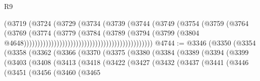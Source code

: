 \begin{lexlean}{R9}
\begin{coremodule}
{{{{{{{{{{{{{{{{{{{{{{{{{{{{{{{{{{{{{{{{{{{{{{{{{{{{{{{{{{{{{{{{{{{{{{{{{{{{{{{{{{{{                                                              (@3719
                                                                (@3724
                                                                  (@3729
                                                                    (@3734
                                                                      (@3739
                                                                        (@3744
                                                                          (@3749
                                                                            (@3754
                                                                              (@3759
                                                                                (@3764
                                                                                  (@3769
                                                                                    (@3774
                                                                                      (@3779
                                                                                        (@3784
                                                                                          (@3789
                                                                                            (@3794
                                                                                              (@3799
                                                                                                (@3804
                                                                                                  @4648)))))))))))))))))))))))))))))))))))))))))))))))
@4744 := @3346
    (@3350
      (@3354
        (@3358
          (@3362
            (@3366
              (@3370
                (@3375
                  (@3380
                    (@3384
                      (@3389
                        (@3394
                          (@3399
                            (@3403
                              (@3408
                                (@3413
                                  (@3418
                                    (@3422
                                      (@3427
                                        (@3432
                                          (@3437
                                            (@3441
                                              (@3446
                                                (@3451
                                                  (@3456
                                                    (@3460
                                                      (@3465
}}}}}}}}}}}}}}}}}}}}}}}}}}}}}}}}}}}}}}}}}}}}}}}}}}}}}}}}}}}}}}}}}}}}}}}}}}}}}}}}}}}}
\end{coremodule}
\end{lexlean}
